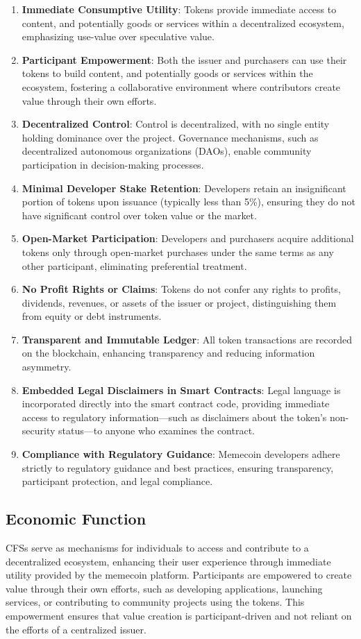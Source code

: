 \documentclass[a4paper,12pt]{article}
\begin{document}
\begin{enumerate}[label=\alph*)]
 \item \textbf{Immediate Consumptive Utility}: Tokens provide immediate access to content, and potentially goods or services within a decentralized ecosystem, emphasizing use-value over speculative value.
 \item \textbf{Participant Empowerment}: Both the issuer and purchasers can use their tokens to build content, and potentially goods or services within the ecosystem, fostering a collaborative environment where contributors create value through their own efforts.
 \item \textbf{Decentralized Control}: Control is decentralized, with no single entity holding dominance over the project. Governance mechanisms, such as decentralized autonomous organizations (DAOs), enable community participation in decision-making processes.
 \item \textbf{Minimal Developer Stake Retention}: Developers retain an insignificant portion of tokens upon issuance (typically less than 5\%), ensuring they do not have significant control over token value or the market.
 \item \textbf{Open-Market Participation}: Developers and purchasers acquire additional tokens only through open-market purchases under the same terms as any other participant, eliminating preferential treatment.
 \item \textbf{No Profit Rights or Claims}: Tokens do not confer any rights to profits, dividends, revenues, or assets of the issuer or project, distinguishing them from equity or debt instruments.
 \item \textbf{Transparent and Immutable Ledger}: All token transactions are recorded on the blockchain, enhancing transparency and reducing information asymmetry.
 \item \textbf{Embedded Legal Disclaimers in Smart Contracts}: Legal language is incorporated directly into the smart contract code, providing immediate access to regulatory information—such as disclaimers about the token's non-security status—to anyone who examines the contract.
 \item \textbf{Compliance with Regulatory Guidance}: Memecoin developers adhere strictly to regulatory guidance and best practices, ensuring transparency, participant protection, and legal compliance.
\end{enumerate}

\subsection{Economic Function}
CFSs serve as mechanisms for individuals to access and contribute to a decentralized ecosystem, enhancing their user experience through immediate utility provided by the memecoin platform. Participants are empowered to create value through their own efforts, such as developing applications, launching services, or contributing to community projects using the tokens. This empowerment ensures that value creation is participant-driven and not reliant on the efforts of a centralized issuer.
\end{document}
